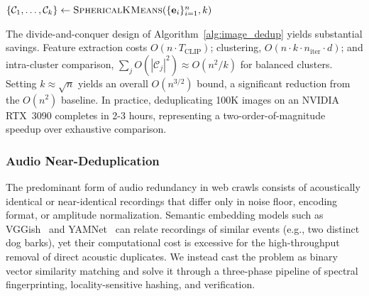 \documentclass[sigconf, nonacm]{acmart}
\begin{document}
\begin{algorithm}[t]
\caption{Semantic Image Deduplication}
\label{alg:image_dedup}


$\{\mathcal{C}_1, \dots, \mathcal{C}_k\} \leftarrow 
\textsc{SphericalKMeans}(\{\mathbf{e}_i\}_{i=1}^{n}, k)$\;


\end{algorithm}


The divide-and-conquer design of Algorithm~\ref{alg:image_dedup} yields substantial savings. Feature extraction costs $O(n \cdot T_{\text{CLIP}})$; clustering, $O(n \cdot k \cdot n_{\text{iter}} \cdot d)$; and intra-cluster comparison, $\sum_j O(|\mathcal{C}_j|^2) \approx O(n^2/k)$ for balanced clusters. Setting $k \approx \sqrt{n}$ yields an overall $O(n^{3/2})$ bound, a significant reduction from the $O(n^2)$ baseline. In practice, deduplicating 100K images on an NVIDIA RTX~3090 completes in 2-3 hours, representing a two-order-of-magnitude speedup over exhaustive comparison.


\subsubsection{Audio Near-Deduplication}

The predominant form of audio redundancy in web crawls consists of acoustically identical or near-identical recordings that differ only in noise floor, encoding format, or amplitude normalization. Semantic embedding models such as VGGish~\cite{hershey2017cnnarchitectureslargescaleaudio} and YAMNet~\cite{s24072106} can relate recordings of similar events (e.g., two distinct dog barks), yet their computational cost is excessive for the high-throughput removal of direct acoustic duplicates. We instead cast the problem as binary vector similarity matching and solve it through a three-phase pipeline of spectral fingerprinting, locality-sensitive hashing, and verification.
\end{document}
